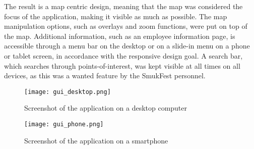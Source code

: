 The result is a map centric design, meaning that the map was considered the focus of the application, making it visible as much as possible. The map manipulation options, such as overlays and zoom functions, were put on top of the map. Additional information, such as an employee information page, is accessible through a menu bar on the desktop or on a slide-in menu on a phone or tablet screen, in accordance with the responsive design goal. A search bar, which searches through points-of-interest, was kept visible at all times on all devices, as this was a wanted feature by the SmukFest personnel.

\begin{figure}
    \centering
\texttt{[image: gui\_desktop.png]}
\caption{Screenshot of the application on a desktop computer}
\label{desktopscreenshot}
\end{figure}

\begin{figure}
    \centering
\texttt{[image: gui\_phone.png]}
\caption{Screenshot of the application on a smartphone}
\label{phonescreenshot}
\end{figure}
